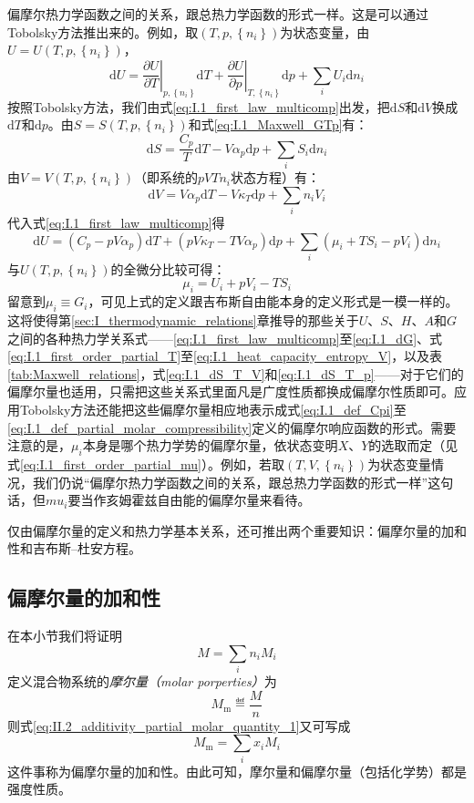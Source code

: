 \documentclass[main.tex]{subfiles}
\begin{document}
偏摩尔热力学函数之间的关系，跟总热力学函数的形式一样。这是可以通过Tobolsky方法推出来的。例如，取$\left(T,p,\left\{n_i\right\}\right)$为状态变量，由$U=U\left(T,p,\left\{n_i\right\}\right)$，
\[\mathrm{d}U=\left.\frac{\partial U}{\partial T}\right|_{p,\left\{n_i\right\}}\mathrm{d}T+\left.\frac{\partial U}{\partial p}\right|_{T,\left\{n_i\right\}}\mathrm{d}p+\sum_i U_i\mathrm{d}n_i\]
按照Tobolsky方法，我们由式\eqref{eq:I.1_first_law_multicomp}出发，把$\mathrm{d}S$和$\mathrm{d}V$换成$\mathrm{d}T$和$\mathrm{d}p$。由$S=S\left(T,p,\left\{n_i\right\}\right)$和式\eqref{eq:I.1_Maxwell_GTp}有：
\[\mathrm{d}S=\frac{C_p}{T}\mathrm{d}T-V\alpha_p\mathrm{d}p+\sum_iS_i\mathrm{d}n_i\]
由$V=V\left(T,p,\left\{n_i\right\}\right)$（即系统的$pVTn_i$状态方程）有：
\[\mathrm{d}V=V\alpha_p\mathrm{d}T-V\kappa_T\mathrm{d}p+\sum_in_iV_i\]
代入式\eqref{eq:I.1_first_law_multicomp}得
\[\mathrm{d}U=\left(C_p-pV\alpha_p\right)\mathrm{d}T+\left(pV\kappa_T-TV\alpha_p\right)\mathrm{d}p+\sum_i\left(\mu_i+TS_i-pV_i\right)\mathrm{d}n_i\]
与$U\left(T,p,\left\{n_i\right\}\right)$的全微分比较可得：
\begin{equation}\label{eq:II.2_partial_molar_thermodynamic_functions_relation}
  \mu_i=U_i+pV_i-TS_i
\end{equation}
留意到$\mu_i\equiv G_i$，可见上式的定义跟吉布斯自由能本身的定义形式是一模一样的。这将使得第\ref{sec:I_thermodynamic_relations}章推导的那些关于$U$、$S$、$H$、$A$和$G$之间的各种热力学关系式——\eqref{eq:I.1_first_law_multicomp}至\eqref{eq:I.1_dG}、式\eqref{eq:I.1_first_order_partial_T}至\eqref{eq:I.1_heat_capacity_entropy_V}，以及表\ref{tab:Maxwell_relations}，式\eqref{eq:I.1_dS_T_V}和\eqref{eq:I.1_dS_T_p}——对于它们的偏摩尔量也适用，只需把这些关系式里面凡是广度性质都换成偏摩尔性质即可。应用Tobolsky方法还能把这些偏摩尔量相应地表示成式\eqref{eq:I.1_def_Cpi}至\eqref{eq:I.1_def_partial_molar_compressibility}定义的偏摩尔响应函数的形式。需要注意的是，$\mu_i$本身是哪个热力学势的偏摩尔量，依状态变明$X$、$Y$的选取而定（见式\eqref{eq:I.1_first_order_partial_mu}）。例如，若取$\left(T,V,\left\{n_i\right\}\right)$为状态变量情况，我们仍说“偏摩尔热力学函数之间的关系，跟总热力学函数的形式一样”这句话，但$mu_i$要当作亥姆霍兹自由能的偏摩尔量来看待。

仅由偏摩尔量的定义和热力学基本关系，还可推出两个重要知识：偏摩尔量的加和性和吉布斯--杜安方程。

\subsection{偏摩尔量的加和性}
在本小节我们将证明
\begin{equation}\label{eq:II.2_additivity_partial_molar_quantity_1}
  M=\sum_in_iM_i
\end{equation}
定义混合物系统的\emph{摩尔量（molar porperties）}为
\[M_\text{m}\eqdef \frac{M}{n}\]
则式\eqref{eq:II.2_additivity_partial_molar_quantity_1}又可写成
\begin{equation}\label{eq:II.2_additivity_partial_molar_quantity_2}
  M_\text{m}=\sum_ix_iM_i
\end{equation}
这件事称为偏摩尔量的加和性。由此可知，摩尔量和偏摩尔量（包括化学势）都是强度性质。
\end{document}

